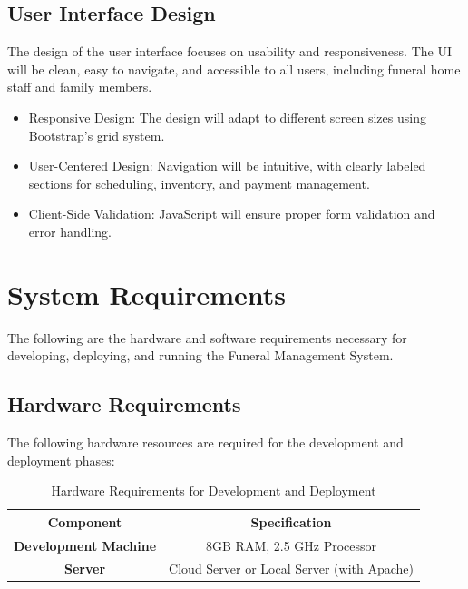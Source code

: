 \documentclass[a4paper,12pt]{report}
\begin{document}
\subsection{User Interface Design}
The design of the user interface focuses on usability and responsiveness. The UI will be clean, easy to navigate, and accessible to all users, including funeral home staff and family members.

\begin{itemize}
    \item Responsive Design: The design will adapt to different screen sizes using Bootstrap's grid system.
    \item User-Centered Design: Navigation will be intuitive, with clearly labeled sections for scheduling, inventory, and payment management.
    \item Client-Side Validation: JavaScript will ensure proper form validation and error handling.
\end{itemize}

\section{System Requirements}
The following are the hardware and software requirements necessary for developing, deploying, and running the Funeral Management System.

\subsection{Hardware Requirements}
The following hardware resources are required for the development and deployment phases:
\begin{table}[ht]
\centering
\begin{tabular}{|c|c|}
\hline
\textbf{Component} & \textbf{Specification} \\
\hline
\textbf{Development Machine} & 8GB RAM, 2.5 GHz Processor \\
\textbf{Server} & Cloud Server or Local Server (with Apache) \\
\hline
\end{tabular}
\caption{Hardware Requirements for Development and Deployment}
\label{tab:hardware_requirements}
\end{table}
\end{document}
